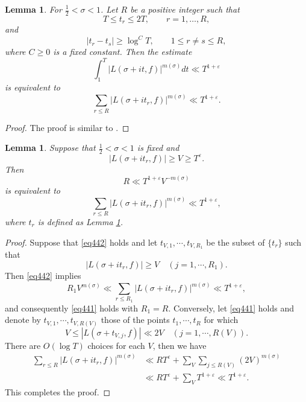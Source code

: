 \documentclass[10pt,leqno]{amsart}
\numberwithin{equation}{section}
\newtheorem{lemma}[definition]{{Lemma}}
\begin{document}
\begin{lemma}\label{le4.11}
    For $\frac{1}{2}<\sigma<1$. 
    Let $R$ be  a positive integer  such that
    \[
    T \leqslant t_r \leqslant 2T, \qquad r=1,\dots,R,
    \]
    and
    \[
    |t_r - t_s| \geqslant \log^{C} T, \qquad 1 \leqslant r \neq s \leqslant R,
    \]
    where $C \geqslant 0$ is a fixed constant. Then the estimate 
    \[
    \int_1^T |L(\sigma+it,f)|^{m(\sigma)}dt\ll T^{1+\varepsilon}
    \]
    is equivalent to
    \[
    \sum_{r\leqslant R}|L(\sigma+it_r,f)|^{m(\sigma)}\ll T^{1+\varepsilon}.
    \]
\end{lemma}
\begin{proof}
    The proof is similar to \cite[Section 8.1]{MR792089}.
\end{proof}

\begin{lemma}\label{le4.12}
    Suppose that $\frac{1}{2}<\sigma<1$ is fixed and
    \[
    |L(\sigma+it_r,f)|\geqslant V \geqslant T^\varepsilon.
    \]
    Then 
    \begin{equation}\label{eq441}
        R\ll T^{1+\varepsilon}V^{-m(\sigma)}
    \end{equation}
    is equivalent to
    \begin{equation}\label{eq442}
        \sum_{r\leqslant R}|L(\sigma+it_r,f)|^{m(\sigma)}\ll T^{1+\varepsilon},
    \end{equation}
    where $t_r$ is defined as Lemma \ref{le4.11}.
\end{lemma}
\begin{proof}
    Suppose that \eqref{eq442} holds and let $t_{V,1},\cdots,t_{V,R_1}$ be the subset of $\{t_r\}$ such that 
    \[
    \left|L(\sigma+it_r,f)\right|\geqslant V \quad (j=1,\cdots,R_1).
    \]
    Then \eqref{eq442} implies 
    \[
    R_1V^{m(\sigma)}\ll \sum_{r\leqslant R_1} \left|L(\sigma+it_r,f)\right|^{m(\sigma)} \ll T^{1+\varepsilon},
    \]
    and consequently \eqref{eq441} holds with $R_1=R$. Conversely, let \eqref{eq441} holds and denote by $t_{V,1},\cdots,t_{V,R(V)}$ those of the points $t_1,\cdots,t_R$ for which
    \[
    V\leqslant \left|L(\sigma+t_{V,j},f)\right|\ll 2V \quad (j=1,\cdots,R(V)).
    \]
    There are $O\left(\log T\right)$ choices for each $V$, then we have
    \[
    \begin{aligned}
        \sum_{r\leqslant R} \left|L(\sigma+it_r,f)\right|^{m(\sigma)}&\ll RT^\varepsilon+\sum_V\sum_{j\leqslant R(V)}\left(2V\right)^{m(\sigma)}\\
        &\ll RT^\varepsilon+\sum_VT^{1+\varepsilon}\ll T^{1+\varepsilon}.
    \end{aligned}
    \]
    This completes the proof.
\end{proof}
\end{document}
